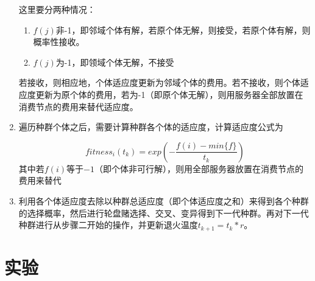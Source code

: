 \documentclass[a4paper,11pt,onecolumn,twoside]{article}
\begin{document}
\begin{multicols}{2}
\begin{enumerate}
这里要分两种情况：
\begin{enumerate}
	\item $f(j)$非-1，即邻域个体有解，若原个体无解，则接受，若原个体有解，则概率性接收。
	\item $f(j)$为-1，即领域个体无解，不接受
\end{enumerate}

若接收，则相应地，个体适应度更新为邻域个体的费用。若不接收，则个体适应度更新为原个体的费用，若为-1（即原个体无解），则用服务器全部放置在消费节点的费用来替代适应度。

\item 遍历种群个体之后，需要计算种群各个体的适应度，计算适应度公式为

$$fitness_i(t_k) = exp(-\frac{f(i)-min\{f\}}{t_k})$$
其中若$f(i)$等于$-1$（即个体非可行解），则用全部服务器放置在消费节点的费用来替代

\item 利用各个体适应度去除以种群总适应度（即个体适应度之和）来得到各个种群的选择概率，然后进行轮盘赌选择、交叉、变异得到下一代种群。再对下一代种群进行从步骤二开始的操作，并更新退火温度$t_{k+1} = t_k * r$。

\end{enumerate}

\section{实验}


\end{multicols}
\end{document}

